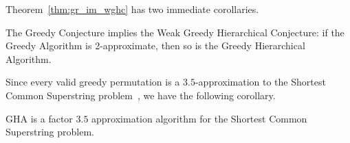 Theorem~\ref{thm:gr_im_wghc} has two immediate corollaries.
\begin{corollary}
The Greedy Conjecture implies the Weak Greedy Hierarchical Conjecture: if the Greedy Algorithm is 2-approximate, then so is the Greedy Hierarchical Algorithm.
\end{corollary}
Since every valid greedy permutation is a $3.5$-approximation to the Shortest Common Superstring problem~\cite{KS2005}, we have the following corollary.
\begin{corollary}
GHA is a factor $3.5$ approximation algorithm for the Shortest Common Superstring problem.
\end{corollary}